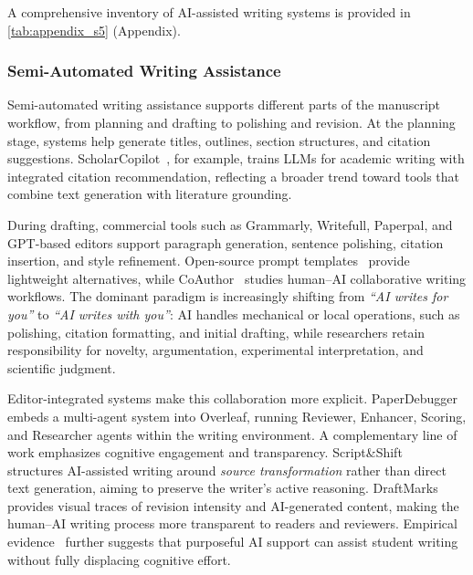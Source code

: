 A comprehensive inventory of AI-assisted writing systems is provided in \cref{tab:appendix_s5} (Appendix).



\subsubsection{Semi-Automated Writing Assistance}
\label{sec:writing_semi}

Semi-automated writing assistance supports different parts of the manuscript workflow, from planning and drafting to polishing and revision. At the planning stage, systems help generate titles, outlines, section structures, and citation suggestions. ScholarCopilot~\cite{scholarcop2025}, for example, trains LLMs for academic writing with integrated citation recommendation, reflecting a broader trend toward tools that combine text generation with literature grounding.

During drafting, commercial tools such as Grammarly, Writefull, Paperpal, and GPT-based editors support paragraph generation, sentence polishing, citation insertion, and style refinement. Open-source prompt templates~\cite{leey21awesome} provide lightweight alternatives, while CoAuthor~\cite{coauthor2022} studies human--AI collaborative writing workflows. The dominant paradigm is increasingly shifting from \emph{``AI writes for you''} to \emph{``AI writes with you''}: AI handles mechanical or local operations, such as polishing, citation formatting, and initial drafting, while researchers retain responsibility for novelty, argumentation, experimental interpretation, and scientific judgment.

Editor-integrated systems make this collaboration more explicit. PaperDebugger~\cite{paperdebugger2025} embeds a multi-agent system into Overleaf, running Reviewer, Enhancer, Scoring, and Researcher agents within the writing environment. A complementary line of work emphasizes cognitive engagement and transparency. Script\&Shift~\cite{siddiqui2025scriptshift} structures AI-assisted writing around \emph{source transformation} rather than direct text generation, aiming to preserve the writer's active reasoning. DraftMarks~\cite{siddiqui2025draftmarks} provides visual traces of revision intensity and AI-generated content, making the human--AI writing process more transparent to readers and reviewers. Empirical evidence~\cite{siddiqui2025aiwriting} further suggests that purposeful AI support can assist student writing without fully displacing cognitive effort.

